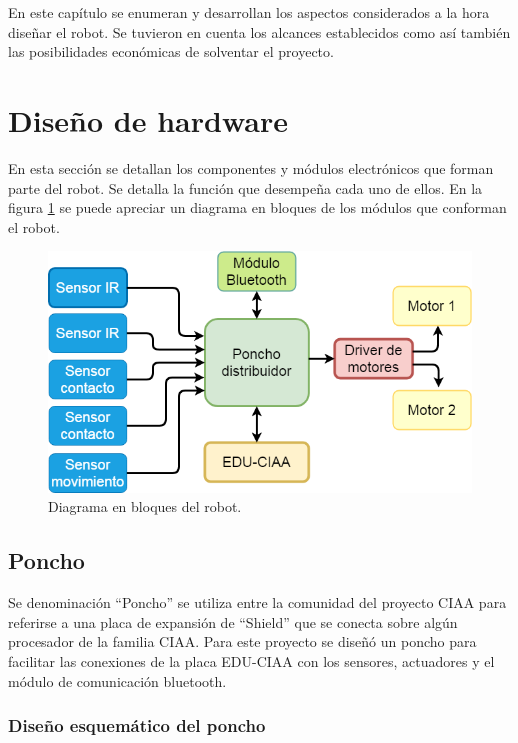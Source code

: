 En este capítulo se enumeran y desarrollan los aspectos considerados a la hora diseñar el robot. Se tuvieron en cuenta los alcances establecidos como así también las posibilidades económicas de solventar el proyecto.
\section{Diseño de hardware}

En esta sección se detallan los componentes y módulos electrónicos que forman parte del robot. Se detalla la función que desempeña cada uno de ellos. En la figura \ref{fig:diagramaini} se puede apreciar un diagrama en bloques de los módulos que conforman el robot.


\begin{figure}[h]
	\centering
	\includegraphics[width=12cm]{./Figures/diagini.PNG}
	\caption{Diagrama en bloques del robot.}
	\label{fig:diagramaini}
\end{figure}



	\subsection{Poncho}
Se denominación  “Poncho”  se utiliza entre la comunidad del proyecto CIAA para referirse a una  placa de expansión de “Shield”  que se conecta sobre algún procesador de la familia CIAA.  Para este proyecto se diseñó un poncho para facilitar las conexiones de la placa EDU-CIAA con los sensores, actuadores y el módulo de comunicación bluetooth.

		\subsubsection{Diseño esquemático del poncho}

